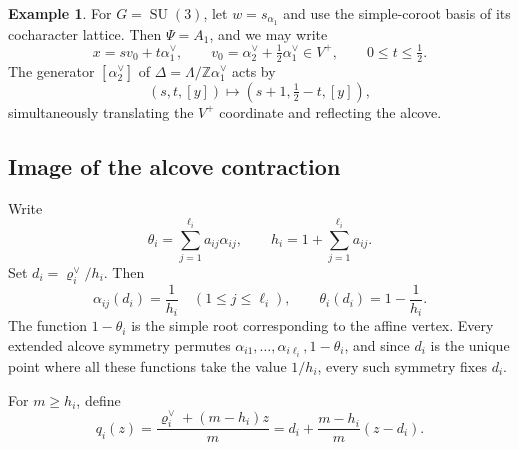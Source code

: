\documentclass[11pt,a4paper,reqno]{amsart}
\theoremstyle{plain}
\theoremstyle{definition}
\newtheorem{example}[theorem]{Example}
\theoremstyle{remark}
\numberwithin{equation}{section}
\newcommand{\SU}{\operatorname{SU}}
\newcommand{\ZZ}{\mathbb Z}
\newcommand{\rh}{\varrho^\vee}
\begin{document}
\begin{example}\label{ex:latticecoupling} For $G=\SU(3)$, let $w=s_{\alpha_1}$ and use the simple-coroot basis of its cocharacter lattice. Then $\Psi=A_1$, and we may write
\[
x=s v_0+t\alpha_1^\vee,\qquad v_0=\alpha_2^\vee+\tfrac12\alpha_1^\vee\in V^+, \qquad 0\le t\le\tfrac12.
\]
The generator $[\alpha_2^\vee]$ of $\Delta=\Lambda/\ZZ\alpha_1^\vee$ acts by
\[
(s,t,[y])\longmapsto(s+1,\tfrac12-t,[y]),
\]
simultaneously translating the $V^+$ coordinate and reflecting the alcove.
\end{example}

\subsection{Image of the alcove contraction}

Write
\begin{equation}\label{eq:affinerootsum}
\theta_i=\sum_{j=1}^{\ell_i}a_{ij}\alpha_{ij}, \qquad h_i=1+\sum_{j=1}^{\ell_i}a_{ij}.
\end{equation}
Set $d_i=\rh_i/h_i$. Then
\[
\alpha_{ij}(d_i)=\frac1{h_i}\quad(1\le j\le\ell_i), \qquad \theta_i(d_i)=1-\frac1{h_i}.
\]
The function $1-\theta_i$ is the simple root corresponding to the affine vertex. Every extended alcove symmetry permutes $\alpha_{i1},\ldots,\alpha_{i\ell_i},1-\theta_i$, and since $d_i$ is the unique point where all these functions take the value $1/h_i$, every such symmetry fixes $d_i$.

For $m\ge h_i$, define
\begin{equation}\label{eq:q}
q_i(z)=\frac{\rh_i+(m-h_i)z}{m} =d_i+\frac{m-h_i}{m}(z-d_i).
\end{equation}
\end{document}
